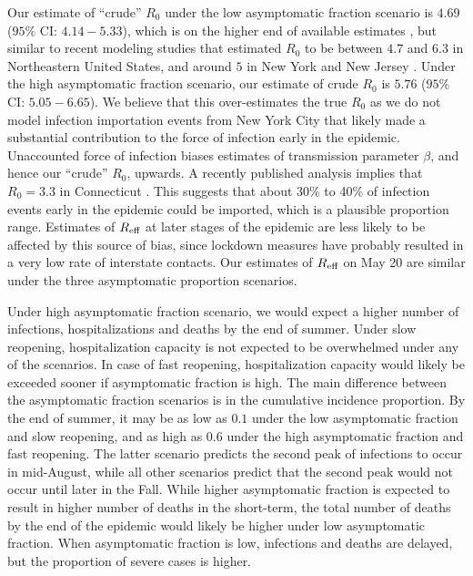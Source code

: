 \documentclass[11pt]{article}
\begin{document}
Our estimate of ``crude'' $R_0$ under the low asymptomatic fraction scenario is $4.69$ ($95\%$ CI: $4.14 - 5.33$), which is on the higher end of available estimates \citep{cdc2020scenarios, li2020early, li2020substantial, kissler2020projecting, ferguson2020impact, perez2020importance, he2020estimation, chow2020global}, but similar to recent modeling studies that estimated $R_0$ to be between $4.7$  and $6.3$ in Northeastern United States, and around $5$ in New York and New Jersey \citep{miller2020mobility, chow2020global}. Under the high asymptomatic fraction scenario, our estimate of crude $R_0$ is $5.76$ ($95\%$ CI: $5.05 - 6.65$). We believe that this over-estimates the true $R_0$ as we do not model infection importation events from New York City that likely made a substantial contribution to the force of infection early in the epidemic. 
Unaccounted force of infection biases estimates of transmission parameter $\beta$, and hence our ``crude'' $R_0$, upwards. 
A recently published analysis implies that $R_0 = 3.3$ in Connecticut \citep{kaplan2020covid}. This suggests that about 30\% to 40\% of infection events early in the epidemic could be imported, which is a plausible proportion range. 
Estimates of $R\textsubscript{eff}$ at later stages of the epidemic are less likely to be affected by this source of bias, since lockdown measures have probably resulted in a very low rate of interstate contacts. Our estimates of $R\textsubscript{eff}$ on May 20 are similar under the three asymptomatic proportion scenarios.

Under high asymptomatic fraction scenario, we would expect a higher number of infections, hospitalizations and deaths by the end of summer. 
Under slow reopening, hospitalization capacity is not expected to be overwhelmed under any of the scenarios. 
In case of fast reopening, hospitalization capacity would likely be exceeded sooner if asymptomatic fraction is high. 
The main difference between the asymptomatic fraction scenarios is in the cumulative incidence proportion. By the end of summer, it may be as low as $0.1$ under the low asymptomatic fraction and slow reopening, and as high as $0.6$ under the high asymptomatic fraction and fast reopening. The latter scenario predicts the second peak of infections to occur in mid-August, while all other scenarios predict that the second peak would not occur until later in the Fall. 
While higher asymptomatic fraction is expected to result in higher number of deaths in the short-term, the total number of deaths by the end of the epidemic would likely be higher under low asymptomatic fraction. When asymptomatic fraction is low, infections and deaths are delayed, but the proportion of severe cases is higher. 
\end{document}
